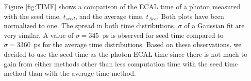 Figure \ref{fig:TIME} shows a comparison of the ECAL time of a photon measured with the seed time, $t_{seed}$, and the average time, $t_{Ave}$. Both plots have been normalized to one.
\newline
The spread in both time distributions, $\sigma$ of a Gaussian fit are very similar. A value of  $\sigma = 345$~ps is observed for seed time compared to $\sigma = 3360$~ps for the average time distributions.  Based on these observations, we decided to use  the seed time as the photon ECAL time since there is not much to gain from either methods other than less computation time with the seed time method than with the average time method. 
